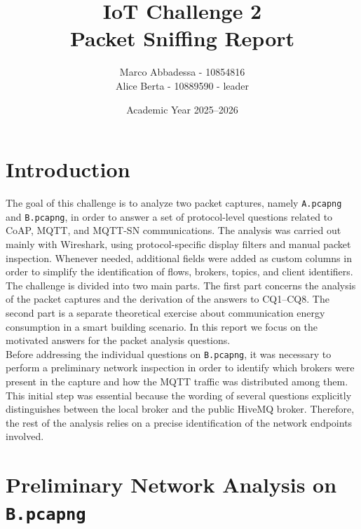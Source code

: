 \documentclass[a4paper,11pt]{article}
\title{
    \vspace{-1cm}
    {\Huge\textcolor{bluepoli}{IoT Challenge 2}}\\[0.4cm]
    {\Large Packet Sniffing Report}
}
\author{
    Marco Abbadessa - 10854816 \\
    Alice Berta - 10889590 - leader
}
\date{Academic Year 2025--2026}
\begin{document}
\maketitle
\thispagestyle{empty}

\vspace{0.5cm}
\tableofcontents
\newpage

\section{Introduction}

The goal of this challenge is to analyze two packet captures, namely
\texttt{A.pcapng} and \texttt{B.pcapng}, in order to answer a set of protocol-level
questions related to CoAP, MQTT, and MQTT-SN communications. The analysis was carried
out mainly with Wireshark, using protocol-specific display filters and manual packet
inspection. Whenever needed, additional fields were added as custom columns in order
to simplify the identification of flows, brokers, topics, and client identifiers.\\

The challenge is divided into two main parts. The first part concerns the analysis of
the packet captures and the derivation of the answers to CQ1--CQ8. The second part is
a separate theoretical exercise about communication energy consumption in a smart
building scenario. In this report we focus on the motivated answers for the packet
analysis questions.\\

Before addressing the individual questions on \texttt{B.pcapng}, it was necessary to
perform a preliminary network inspection in order to identify which brokers were
present in the capture and how the MQTT traffic was distributed among them. This
initial step was essential because the wording of several questions explicitly
distinguishes between the local broker and the public HiveMQ broker. Therefore, the
rest of the analysis relies on a precise identification of the network endpoints
involved.

\section{Preliminary Network Analysis on \texttt{B.pcapng}}
\end{document}
